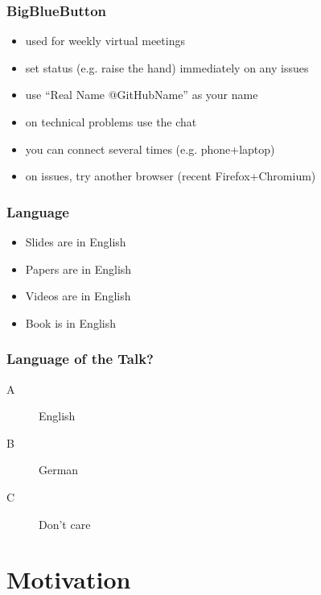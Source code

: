 

\date{3.3.2021}



\renewcommand{\enquote}[1]{\emph{``#1''}} %

\begin{frame}
	\titlepage
	\doclicenseThis
\end{frame}

\begin{frame}
	\frametitle{BigBlueButton}
	\begin{itemize}
		\item used for weekly virtual meetings
		\item set status (e.g. raise the hand) immediately on any issues
		\item use ``Real Name @GitHubName'' as your name
		\item on technical problems use the chat
		\item you can connect several times (e.g. phone+laptop)
		\item on issues, try another browser (recent Firefox+Chromium)
	\end{itemize}
\end{frame}

\begin{frame}
	\frametitle{Language}
	\begin{itemize}
		\item Slides are in English
		\item Papers are in English
		\item Videos are in English
		\item Book is in English
	\end{itemize}
\end{frame}

\begin{assignment}
	\frametitle{Language of the Talk?}
	\begin{task}
	\begin{description}
	\item[A] English
	\item[B] German
	\item[C] Don't care
	\end{description}
	\end{task}
\end{assignment}

\section{Motivation}
